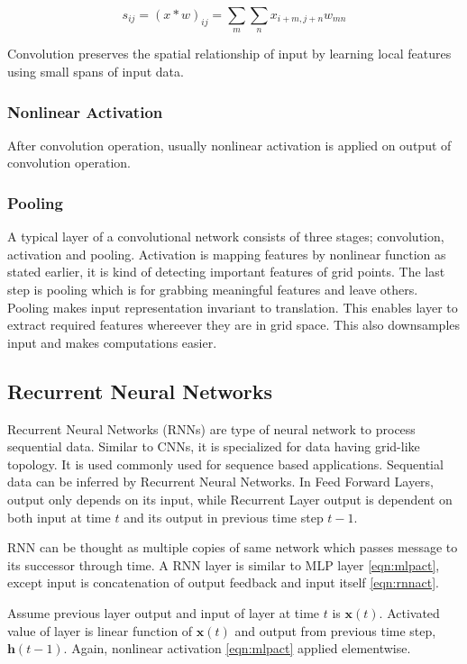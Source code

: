 \begin{equation}
\label{eqn:conv2d}
s_{ij} = (x*w)_{ij} = \sum_{m} \sum_{n} x_{i+m,j+n} w_{mn}
\end{equation}

Convolution preserves the spatial relationship of input by learning local features using small spans of input data. 

\subsubsection{Nonlinear Activation}
After convolution operation, usually nonlinear activation is applied on output of convolution operation.

\subsubsection{Pooling}
A typical layer of a convolutional network consists of three stages; convolution, activation and pooling. Activation is mapping features by nonlinear function as stated earlier, it is kind of detecting important features of grid points. The last step is pooling which is for grabbing meaningful features and leave others.
Pooling makes input representation invariant to translation. This enables layer to extract required features whereever they are in grid space. This also downsamples input and makes computations easier.


\subsection{Recurrent Neural Networks}
Recurrent Neural Networks (RNNs) \cite{rumelhart_learning_1986} are type of neural network to process sequential data. Similar to CNNs, it is specialized for data having grid-like topology. It is used commonly used for sequence based applications.
Sequential data can be inferred by Recurrent Neural Networks. In Feed Forward Layers, output only depends on its input, while Recurrent Layer output is dependent on both input at time $t$ and its output in previous time step $t-1$.

RNN can be thought as multiple copies of same network which passes message to its successor through time. A RNN layer is similar to MLP layer \ref{eqn:mlpact}, except input is concatenation of output feedback and input itself \ref{eqn:rnnact}.

Assume previous layer output and input of layer at time $t$ is $\boldsymbol{x}(t)$. Activated value of layer is linear function of $\boldsymbol{x}(t)$ and output from previous time step, $\boldsymbol{h}(t-1)$. Again, nonlinear activation \ref{eqn:mlpact} applied elementwise. 

